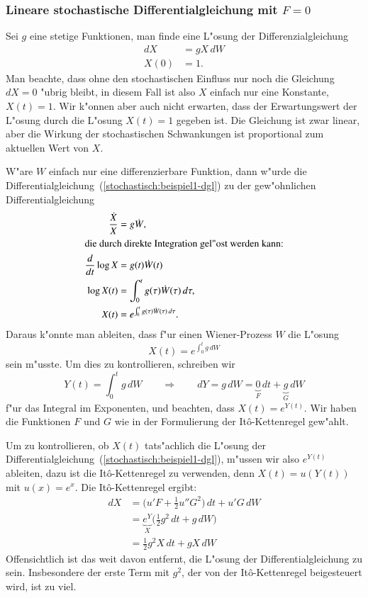 \subsubsection{Lineare stochastische Differentialgleichung mit $F=0$}
Sei $g$ eine stetige Funktionen, man finde eine L"osung der
Differenzialgleichung
\begin{equation}
\begin{aligned}
dX&=gX\,dW\\
X(0)&=1.
\end{aligned}
\label{stochastisch:beispiel1-dgl}
\end{equation}
Man beachte, dass ohne den stochastischen Einfluss nur noch die Gleichung
$dX=0$ "ubrig bleibt, in diesem Fall ist also $X$ einfach nur eine
Konstante, $X(t)=1$.
Wir k"onnen aber auch nicht erwarten, dass der Erwartungswert der
L"osung durch die L"osung $X(t)=1$ gegeben ist.
Die Gleichung ist zwar linear, aber die Wirkung der stochastischen
Schwankungen ist proportional zum aktuellen Wert von $X$.

W"are $W$ einfach nur eine differenzierbare Funktion, dann w"urde die
Differentialgleichung~(\ref{stochastisch:beispiel1-dgl}) zu der
gew"ohnlichen Differentialgleichung
\begin{align*}
\frac{\dot X}{X} &= g\dot W,
\\
\intertext{die durch direkte Integration gel"ost werden kann:}
\frac{d}{dt}\log X&= g(t) \dot W(t)
\\
\log X(t)&=\int_0^t g(\tau)\dot W(\tau)\,d\tau,
\\
X(t)&=e^{\int_0^t g(\tau)\dot W(\tau)\,d\tau}.
\end{align*}
Daraus k"onnte man ableiten, dass f"ur einen Wiener-Prozess $W$ die L"osung
\[
X(t)=e^{\int_0^t g\,dW}
\]
sein m"usste.
Um dies zu kontrollieren, schreiben wir 
\[
Y(t)=\int_0^t g\,dW
\qquad\Rightarrow\qquad
dY = g\,dW = \underbrace{0}_{\textstyle F}\,dt
+
\underbrace{g}_{\textstyle G}\,dW
\]
f"ur das Integral im Exponenten, und beachten, dass $X(t)=e^{Y(t)}$.
Wir haben die Funktionen $F$ und $G$ wie in der Formulierung der
It\^o-Kettenregel gew"ahlt.

Um zu kontrollieren, ob $X(t)$ tats"achlich die L"osung der
Differentialgleichung~(\ref{stochastisch:beispiel1-dgl}), m"ussen wir
also $e^{Y(t)}$ ableiten, dazu ist die It\^o-Kettenregel zu verwenden,
denn $X(t)=u(Y(t))$ mit $u(x)=e^x$.
Die It\^o-Kettenregel ergibt:
\begin{align*}
dX
&=
\biggl( u'F+\frac12u''G^2 \biggr)\,dt + u' G\,dW
\\
&=
\underbrace{e^Y}_{\textstyle X}\biggl(\frac12g^2\,dt + g\,dW\biggr)
\\
&=
\frac12g^2X\,dt + gX\,dW
\end{align*}
Offensichtlich ist das weit davon entfernt, die L"osung der
Differentialgleichung zu sein.
Insbesondere der erste Term mit $g^2$, der von der It\^o-Kettenregel
beigesteuert wird, ist zu viel.

